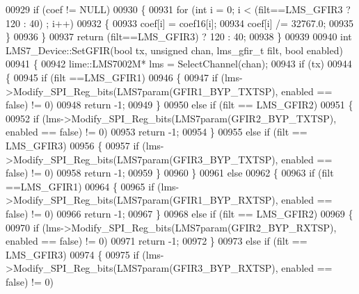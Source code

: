 \begin{DoxyCode}
{{{00929     \textcolor{keywordflow}{if} (coef != NULL)
00930     \{
00931         \textcolor{keywordflow}{for} (\textcolor{keywordtype}{int} i = 0; i < (filt==LMS_GFIR3 ? 120 : 40) ; i++)
00932         \{
00933             coef[i] = coef16[i];
00934             coef[i] /= 32767.0;
00935         \}
00936     \}
00937     \textcolor{keywordflow}{return} (filt==LMS_GFIR3) ? 120 : 40;
00938 \}
00939 
00940 \textcolor{keywordtype}{int} LMS7_Device::SetGFIR(\textcolor{keywordtype}{bool} tx, \textcolor{keywordtype}{unsigned} chan, lms_gfir_t filt, \textcolor{keywordtype}{bool} enabled)
00941 \{
00942     lime::LMS7002M* lms = SelectChannel(chan);
00943     \textcolor{keywordflow}{if} (tx)
00944     \{
00945         \textcolor{keywordflow}{if} (filt ==LMS_GFIR1)
00946         \{
00947             \textcolor{keywordflow}{if} (lms->Modify_SPI_Reg_bits(LMS7param(GFIR1_BYP_TXTSP), enabled == \textcolor{keyword}{false}) != 0)
00948                 \textcolor{keywordflow}{return} -1;
00949         \}
00950         \textcolor{keywordflow}{else} \textcolor{keywordflow}{if} (filt == LMS_GFIR2)
00951         \{
00952             \textcolor{keywordflow}{if} (lms->Modify_SPI_Reg_bits(LMS7param(GFIR2_BYP_TXTSP), enabled == \textcolor{keyword}{false}) != 0)
00953                 \textcolor{keywordflow}{return} -1;
00954         \}
00955         \textcolor{keywordflow}{else} \textcolor{keywordflow}{if} (filt == LMS_GFIR3)
00956         \{
00957             \textcolor{keywordflow}{if} (lms->Modify_SPI_Reg_bits(LMS7param(GFIR3_BYP_TXTSP), enabled == \textcolor{keyword}{false}) != 0)
00958                 \textcolor{keywordflow}{return} -1;
00959         \}
00960     \}
00961     \textcolor{keywordflow}{else}
00962     \{
00963         \textcolor{keywordflow}{if} (filt ==LMS_GFIR1)
00964         \{
00965             \textcolor{keywordflow}{if} (lms->Modify_SPI_Reg_bits(LMS7param(GFIR1_BYP_RXTSP), enabled == \textcolor{keyword}{false}) != 0)
00966                 \textcolor{keywordflow}{return} -1;
00967         \}
00968         \textcolor{keywordflow}{else} \textcolor{keywordflow}{if} (filt == LMS_GFIR2)
00969         \{
00970             \textcolor{keywordflow}{if} (lms->Modify_SPI_Reg_bits(LMS7param(GFIR2_BYP_RXTSP), enabled == \textcolor{keyword}{false}) != 0)
00971                 \textcolor{keywordflow}{return} -1;
00972         \}
00973         \textcolor{keywordflow}{else} \textcolor{keywordflow}{if} (filt == LMS_GFIR3)
00974         \{
00975             \textcolor{keywordflow}{if} (lms->Modify_SPI_Reg_bits(LMS7param(GFIR3_BYP_RXTSP), enabled == \textcolor{keyword}{false}) != 0)
}}}
\end{DoxyCode}

